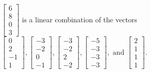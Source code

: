 \begin{exercise}
\begin{exerciseStatement}
  \end{exerciseStatement}
  \begin{exerciseAnswer}
   \(\left[\begin{array}{c}
6 \\
8 \\
0 \\
3
\end{array}\right]\) 
  	 is  
	a linear combination of the vectors \(\left[\begin{array}{c}
0 \\
2 \\
-1 \\
1
\end{array}\right] , \left[\begin{array}{c}
-3 \\
-2 \\
0 \\
-1
\end{array}\right] , \left[\begin{array}{c}
-3 \\
-2 \\
2 \\
-2
\end{array}\right] , \left[\begin{array}{c}
-5 \\
-3 \\
-3 \\
-3
\end{array}\right] , \text{ and } \left[\begin{array}{c}
2 \\
1 \\
1 \\
1
\end{array}\right]\).

	
  


  \end{exerciseAnswer}
\end{exercise}